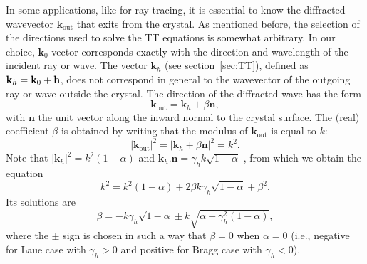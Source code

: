 \documentclass{iucr}
\begin{document}
In some applications, like for ray tracing, it is essential to know the diffracted wavevector $\textbf{k}_{\text{out}}$ that exits from the crystal. As mentioned before, the selection of the directions used to solve the TT equations is somewhat arbitrary. In our choice, $\textbf{k}_0$ vector corresponds exactly with the direction and wavelength of the incident ray or wave.
The vector $\textbf{k}_h$ (see section~\ref{sec:TT}), defined  as $\textbf k_h=\textbf k_0 + \textbf h$, does not correspond in general to the wavevector of the outgoing ray or wave outside the crystal. The direction of the diffracted wave has the form 
\begin{equation}
    \textbf{k}_{\text{out}} = \textbf{k}_h + \beta \textbf{n}, \nonumber
\end{equation}
with $\textbf{n}$ the unit vector along the inward normal to the crystal surface. The (real) coefficient $\beta$ is obtained by writing that the modulus of $\textbf{k}_{\text{out}}$ is equal to $k$:
\begin{equation}
    |\textbf{k}_{\text{out}}|^2 = |\textbf{k}_h + \beta \textbf{n}|^2=k^2. \nonumber
\end{equation}
Note that $|\textbf{k}_h|^2=k^2(1-\alpha)$ and $\textbf{k}_h . \textbf{n} = \gamma_h k \sqrt{1-\alpha}$ , from which we obtain the equation
\begin{equation}
    k^2 = k^2 (1-\alpha) + 
    2 \beta k \gamma_h \sqrt{1-\alpha}
    + \beta^2. \nonumber
\end{equation}
Its solutions are
\begin{equation}
    \beta = - k \gamma_h \sqrt{1-\alpha} \pm k \sqrt{\alpha + \gamma_h^2 (1-\alpha)}, \nonumber
\end{equation}
where the $\pm$ sign is chosen in such a way that $\beta=0$ when $\alpha=0$ (i.e., negative for Laue case with $\gamma_h>0$ and positive for Bragg case with $\gamma_h<0$).

\end{document}
